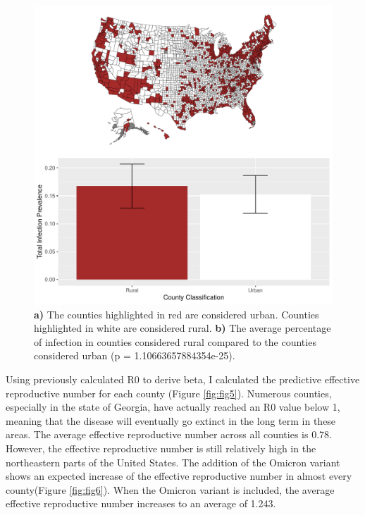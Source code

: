 \documentclass[
  12pt,
]{article}
\begin{document}
\begin{figure}[H]

{\centering \includegraphics{Final-Manuscript_files/figure-latex/fig4-1} 

}

\caption{\textbf{a)} The counties highlighted in red are considered urban. Counties highlighted in white are considered rural. \textbf{b)} The average percentage of infection in counties considered rural compared to the counties considered urban (p = 1.10663657884354e-25).}\label{fig:fig4}
\end{figure}

Using previously calculated R0 to derive beta, I calculated the predictive effective reproductive number for each county (Figure \ref{fig:fig5}). Numerous counties, especially in the state of Georgia, have actually reached an R0 value below 1, meaning that the disease will eventually go extinct in the long term in these areas. The average effective reproductive number across all counties is 0.78. However, the effective reproductive number is still relatively high in the northeastern parts of the United States. The addition of the Omicron variant shows an expected increase of the effective reproductive number in almost every county(Figure \ref{fig:fig6}). When the Omicron variant is included, the average effective reproductive number increases to an average of 1.243.
\end{document}
